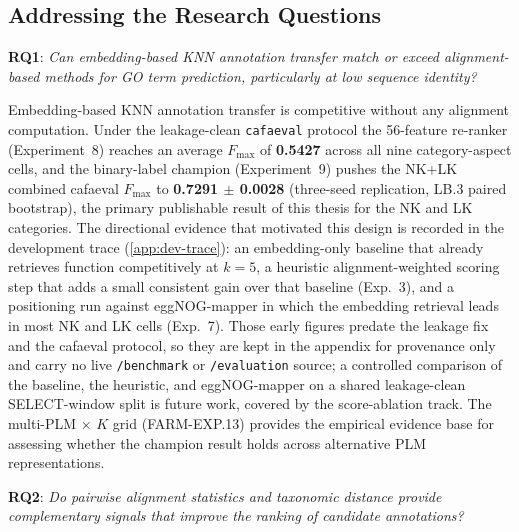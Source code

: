 \subsection{Addressing the Research Questions}

\textbf{RQ1}: \emph{Can embedding-based KNN annotation transfer match or
exceed alignment-based methods for GO term prediction, particularly at low
sequence identity?}

Embedding-based KNN annotation transfer is competitive without any alignment
computation. Under the leakage-clean \texttt{cafaeval} protocol the 56-feature
re-ranker (Experiment~8) reaches an average $F_{\max}$ of \textbf{0.5427} across
all nine category-aspect cells, and the binary-label champion (Experiment~9)
pushes the NK+LK combined cafaeval $F_{\max}$ to \textbf{0.7291 $\pm$ 0.0028}
(three-seed replication, LB.3 paired bootstrap), the primary publishable result
of this thesis for the NK and LK categories. The directional evidence that
motivated this design is recorded in the development trace
(\cref{app:dev-trace}): an embedding-only baseline that already retrieves
function competitively at $k{=}5$, a heuristic alignment-weighted scoring step
that adds a small consistent gain over that baseline (Exp.~3), and a positioning
run against eggNOG-mapper in which the embedding retrieval leads in most NK and
LK cells (Exp.~7). Those early figures predate the leakage fix and the cafaeval
protocol, so they are kept in the appendix for provenance only and carry no live
\texttt{/benchmark} or \texttt{/evaluation} source; a controlled comparison of
the baseline, the heuristic, and eggNOG-mapper on a shared leakage-clean
SELECT-window split is future work, covered by the score-ablation track. The
multi-PLM $\times$ $K$ grid (FARM-EXP.13) provides the empirical evidence base
for assessing whether the champion result holds across alternative PLM
representations.

\textbf{RQ2}: \emph{Do pairwise alignment statistics and taxonomic distance
provide complementary signals that improve the ranking of candidate annotations?}

